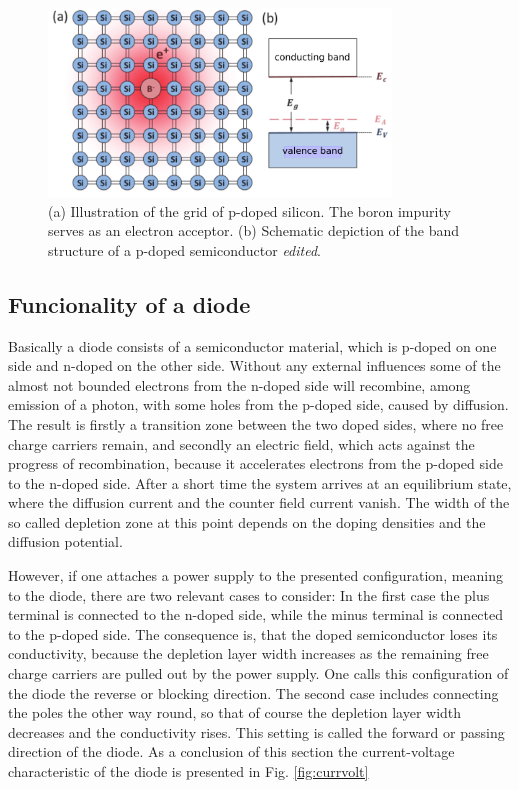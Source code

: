 \begin{figure}
  \centering
  \includegraphics[height=5cm]{Ordnername/acceptor_edit.pdf}
  \caption{(a) Illustration of the grid of p-doped silicon. The boron impurity serves as an electron acceptor.
  (b) Schematic depiction of the band structure of a p-doped semiconductor \cite{semiconductors} \textit{edited}.}
  \label{fig:acceptor}
\end{figure}

\subsection{Funcionality of a diode}

Basically a diode consists of a semiconductor material, which is p-doped on one side and n-doped on the other side.
Without any external influences some of the almost not bounded electrons from the n-doped side will recombine, among emission of a photon,
with some holes from the p-doped side, caused by diffusion. The result is firstly a transition zone between the two doped sides, where
no free charge carriers remain, and secondly an electric field, which acts against the progress of recombination,
because it accelerates electrons from the p-doped side to the n-doped side. After a short time the system arrives at an equilibrium state,
where the diffusion current and the counter field current vanish. The width of the so called depletion zone at this point
depends on the doping densities and the diffusion potential.

However, if one attaches a power supply to the presented configuration, meaning to the diode, there are two relevant cases to consider:
In the first case the plus terminal is connected to the n-doped side, while the minus terminal is connected to the
p-doped side. The consequence is, that the doped semiconductor loses its conductivity, because the depletion layer width
increases as the remaining free charge carriers are pulled out by the power supply. One calls this configuration of the diode
the reverse or blocking direction. The second case includes connecting the poles the other way round, so that of course
the depletion layer width decreases and the conductivity rises. This setting is called the forward or passing direction of the diode.
As a conclusion of this section the current-voltage characteristic of the diode is presented in Fig. \ref{fig:currvolt}

